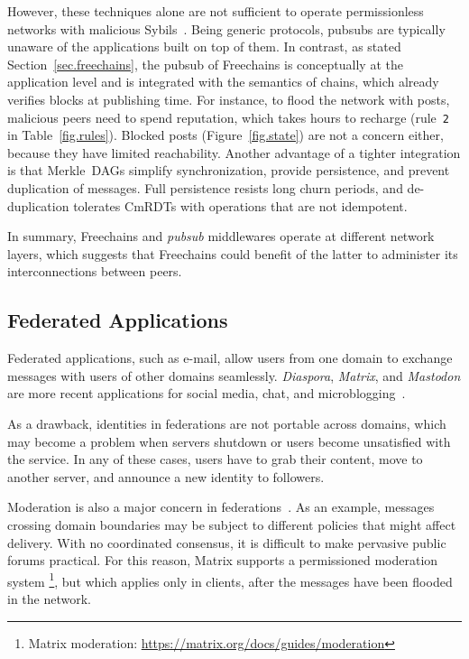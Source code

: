 \documentclass[10pt,journal,compsoc]{IEEEtran}
\newcommand{\FC}       {Freechains\xspace}
\newcommand{\code}[1]  {\texttt{\footnotesize{#1}}}
\begin{document}
However, these techniques alone are not sufficient to operate permissionless
networks with malicious Sybils~\cite{pubsub.gossipsub2}.
Being generic protocols, pubsubs are typically unaware of the applications
built on top of them.
%
In contrast, as stated Section~\ref{sec.freechains}, the pubsub of \FC is
conceptually at the application level and is integrated with the semantics of
chains, which already verifies blocks at publishing time.
For instance, to flood the network with posts, malicious peers need to spend
reputation, which takes hours to recharge (rule~\code{2} in
Table~\ref{fig.rules}).
Blocked posts (Figure~\ref{fig.state}) are not a concern either, because they
have limited reachability.
Another advantage of a tighter integration is that Merkle~DAGs simplify
synchronization, provide persistence, and prevent duplication of messages.
Full persistence resists long churn periods, and de-duplication tolerates
CmRDTs with operations that are not idempotent.

In summary, \FC and \emph{pubsub} middlewares operate at different network
layers, which suggests that \FC could benefit of the latter to administer its
interconnections between peers.

\subsection{Federated Applications}

Federated applications, such as e-mail, allow users from one domain to exchange
messages with users of other domains seamlessly.
\emph{Diaspora}, \emph{Matrix}, and \emph{Mastodon} are more recent
applications for social media, chat, and microblogging~\cite{p2p.ecosystem}.

As a drawback, identities in federations are not portable across domains, which
may become a problem when servers shutdown or users become unsatisfied with the
service.
In any of these cases, users have to grab their content, move to another
server, and announce a new identity to followers.

Moderation is also a major concern in federations~\cite{p2p.ecosystem}.
As an example, messages crossing domain boundaries may be subject to different
policies that might affect delivery.
With no coordinated consensus, it is difficult to make pervasive public forums
practical.
%
For this reason, Matrix supports a permissioned moderation system%
\footnote{Matrix moderation: \url{https://matrix.org/docs/guides/moderation}},
but which applies only in clients, after the messages have been flooded in the
network.
\end{document}
